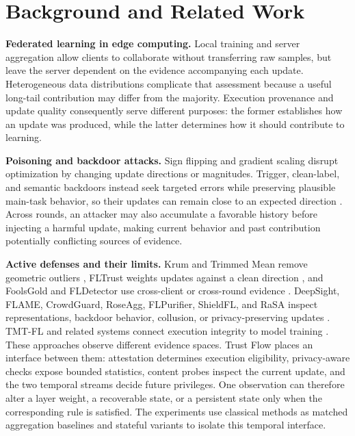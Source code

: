 \documentclass[runningheads,orivec]{llncs}
\begin{document}
\section{Background and Related Work}

\textbf{Federated learning in edge computing.} Local training and server aggregation allow clients to collaborate without transferring raw samples, but leave the server dependent on the evidence accompanying each update. Heterogeneous data distributions complicate that assessment because a useful long-tail contribution may differ from the majority. Execution provenance and update quality consequently serve different purposes: the former establishes how an update was produced, while the latter determines how it should contribute to learning.

\textbf{Poisoning and backdoor attacks.} Sign flipping and gradient scaling disrupt optimization by changing update directions or magnitudes. Trigger, clean-label, and semantic backdoors instead seek targeted errors while preserving plausible main-task behavior, so their updates can remain close to an expected direction \cite{bagdasaryan2020backdoor,wang2019neuralcleanse}. Across rounds, an attacker may also accumulate a favorable history before injecting a harmful update, making current behavior and past contribution potentially conflicting sources of evidence.

\textbf{Active defenses and their limits.} Krum and Trimmed Mean remove geometric outliers \cite{blanchard2017krum,yin2018byzantine}, FLTrust weights updates against a clean direction \cite{cao2021fltrust}, and FoolsGold and FLDetector use cross-client or cross-round evidence \cite{fung2020foolsgold,fldetector2022}. DeepSight, FLAME, CrowdGuard, RoseAgg, FLPurifier, ShieldFL, and RaSA inspect representations, backdoor behavior, collusion, or privacy-preserving updates \cite{deepsight2022,flame2022,crowdguard2024,roseagg,flpurifier,shieldfl,wang2025rasa}. TMT-FL and related systems connect execution integrity to model training \cite{lu2025tmt}. These approaches observe different evidence spaces. Trust Flow places an interface between them: attestation determines execution eligibility, privacy-aware checks expose bounded statistics, content probes inspect the current update, and the two temporal streams decide future privileges. One observation can therefore alter a layer weight, a recoverable state, or a persistent state only when the corresponding rule is satisfied. The experiments use classical methods as matched aggregation baselines and stateful variants to isolate this temporal interface.
\end{document}
